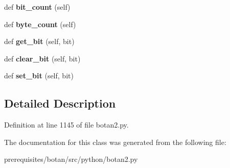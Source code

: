 \begin{DoxyCompactItemize}
def {\bfseries bit\+\_\+count} (self)
\item 
\mbox{\label{classbotan2_1_1_m_p_i_a1cdc265c5cd99ab262fa05e3220fd583}} 
def {\bfseries byte\+\_\+count} (self)
\item 
\mbox{\label{classbotan2_1_1_m_p_i_a1227df697b105e99bbf52c8bb2318026}} 
def {\bfseries get\+\_\+bit} (self, bit)
\item 
\mbox{\label{classbotan2_1_1_m_p_i_a5d91f2b35aa5028ae93aaebb3b8a3d68}} 
def {\bfseries clear\+\_\+bit} (self, bit)
\item 
\mbox{\label{classbotan2_1_1_m_p_i_ac8341d6209affb6a1e8797d84d42cab5}} 
def {\bfseries set\+\_\+bit} (self, bit)
\end{DoxyCompactItemize}


\subsection{Detailed Description}


Definition at line 1145 of file botan2.\+py.



The documentation for this class was generated from the following file\+:\begin{DoxyCompactItemize}
\item 
prerequisites/botan/src/python/botan2.\+py\end{DoxyCompactItemize}
